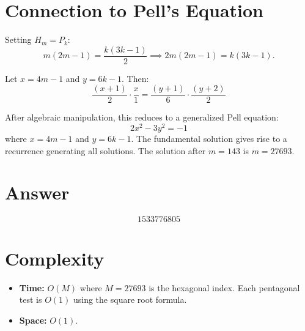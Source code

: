 \documentclass[12pt]{article}
\begin{document}
\section{Connection to Pell's Equation}

Setting $H_m = P_k$:
\[
m(2m-1) = \frac{k(3k-1)}{2} \implies 2m(2m-1) = k(3k-1).
\]

Let $x = 4m - 1$ and $y = 6k - 1$. Then:
\[
\frac{(x+1)}{2} \cdot \frac{x}{1} = \frac{(y+1)}{6} \cdot \frac{(y+2)}{2}
\]

After algebraic manipulation, this reduces to a generalized Pell equation:
\[
2x^2 - 3y^2 = -1
\]
where $x = 4m-1$ and $y = 6k-1$. The fundamental solution gives rise to a recurrence generating all solutions. The solution after $m = 143$ is $m = 27693$.

\section{Answer}

\[
\boxed{1533776805}
\]
\section{Complexity}

\begin{itemize}
    \item \textbf{Time:} $O(M)$ where $M = 27693$ is the hexagonal index. Each pentagonal test is $O(1)$ using the square root formula.
    \item \textbf{Space:} $O(1)$.
\end{itemize}
\end{document}
